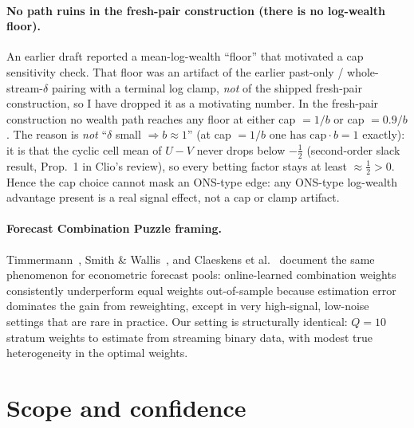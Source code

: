 \documentclass[11pt]{article}
\begin{document}
\paragraph{No path ruins in the fresh-pair construction (there is no log-wealth floor).}
An earlier draft reported a mean-log-wealth ``floor'' that motivated a cap sensitivity
check. That floor was an artifact of the earlier past-only / whole-stream-$\delta$ pairing
with a terminal log clamp, \emph{not} of the shipped fresh-pair construction, so I
have dropped it as a motivating number. In the fresh-pair construction no wealth path reaches
any floor at either cap $=1/b$ or cap $=0.9/b$. The reason is \emph{not} ``$\delta$ small
$\Rightarrow b\approx 1$'' (at cap $=1/b$ one has $\mathrm{cap}\cdot b = 1$ exactly): it is
that the cyclic cell mean of $U-V$ never drops below $-\tfrac12$ (second-order slack result,
Prop.~1 in Clio's review), so every betting factor stays at least $\approx\tfrac12 > 0$. Hence the cap choice cannot mask an
ONS-type edge: any ONS-type log-wealth advantage present is a real signal effect, not a cap
or clamp artifact.

\paragraph{Forecast Combination Puzzle framing.}
Timmermann~\cite{Timmermann2006}, Smith \& Wallis~\cite{SmithWallis2009}, and
Claeskens et al.~\cite{Claeskens2016} document
the same phenomenon for econometric forecast pools: online-learned combination weights
consistently underperform equal weights out-of-sample because estimation error
dominates the gain from reweighting, except in very high-signal, low-noise settings
that are rare in practice.
Our setting is structurally identical: $Q=10$ stratum weights to estimate from
streaming binary data, with modest true heterogeneity in the optimal weights.

\section{Scope and confidence}
\end{document}

